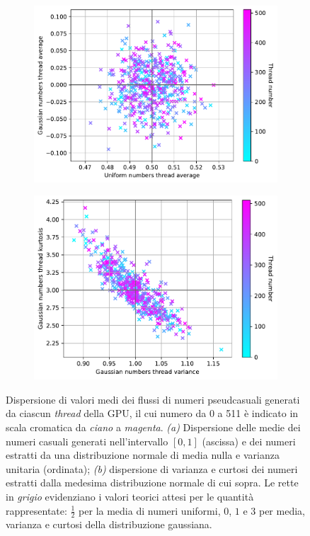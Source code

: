 \begin{figure}[t]
\centering
\begin{subfigure}{.5\textwidth}
  \centering
  \includegraphics[scale=0.5]{graphs/CorrelationTests_UniAvgVsGaussAvg.pdf}
  \caption{}
  \label{fig:unigauss_avg}
\end{subfigure}%
\begin{subfigure}{.5\textwidth}
  \centering
  \includegraphics[scale=0.5]{graphs/CorrelationTests_KurtosisVsVariance.pdf}
  \caption{}
  \label{fig:variance_kurt}
\end{subfigure}
\caption{Dispersione di valori medi dei flussi di numeri pseudcasuali generati da ciascun \textit{thread} della GPU, il cui numero da 0 a 511 è indicato in scala cromatica da \textit{ciano} a \textit{magenta}. \textit{(a)} Dispersione delle medie dei numeri casuali generati nell'intervallo $[0,1]$ (ascissa) e dei numeri estratti da una distribuzione normale di media nulla e varianza unitaria (ordinata); \textit{(b)} dispersione di varianza e curtosi dei numeri estratti dalla medesima distribuzione normale di cui sopra. Le rette in \textit{grigio} evidenziano i valori teorici attesi per le quantità rappresentate: $\frac{1}{2}$ per la media di numeri uniformi, $0$, $1$ e $3$ per media, varianza e curtosi della distribuzione gaussiana.} 
\end{figure}

